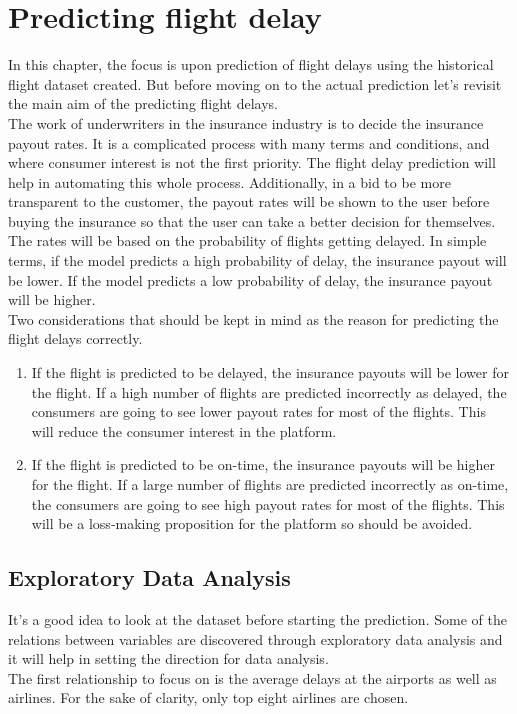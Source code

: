 \chapter{Predicting flight delay}
In this chapter, the focus is upon prediction of flight delays using the historical flight dataset created. But before moving on to the actual prediction let's revisit the main aim of the predicting flight delays.
\\The work of underwriters in the insurance industry is to decide the insurance payout rates. It is a complicated process with many terms and conditions, and where consumer interest is not the first priority. The flight delay prediction will help in automating this whole process. Additionally, in a bid to be more transparent to the customer, the payout rates will be shown to the user before buying the insurance so that the user can take a better decision for themselves. The rates will be based on the probability of flights getting delayed. In simple terms, if the model predicts a high probability of delay, the insurance payout will be lower. If the model predicts a low probability of delay, the insurance payout will be higher.
\\Two considerations that should be kept in mind as the reason for predicting the flight delays correctly.
\begin{enumerate}
    \item If the flight is predicted to be delayed, the insurance payouts will be lower for the flight. If a high number of flights are predicted incorrectly as delayed, the consumers are going to see lower payout rates for most of the flights. This will reduce the consumer interest in the platform.
    \item If the flight is predicted to be on-time, the insurance payouts will be higher for the flight. If a large number of flights are predicted incorrectly as on-time, the consumers are going to see high payout rates for most of the flights. This will be a loss-making proposition for the platform so should be avoided.
\end{enumerate}

\section{Exploratory Data Analysis}
It's a good idea to look at the dataset before starting the prediction. Some of the relations between variables are discovered through exploratory data analysis and it will help in setting the direction for data analysis.
\\The first relationship to focus on is the average delays at the airports as well as airlines. For the sake of clarity, only top eight airlines are chosen. 

